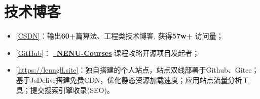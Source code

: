 \documentclass{resume}
\begin{document}
\section{技术博客}
\begin{itemize}[parsep=0.3ex] \normalsize
    \item \href{https://blog.csdn.net/liangllhahaha?type=blog}{[CSDN]}：输出\textbf{60+}篇算法、工程类技术博客, 
    获得\textbf{57w+} 访问量；

    \item \href{https://github.com/leungll}{[GitHub]}：
    \href{https://github.com/leungll/NENU-Courses}{\faGithub \ \textbf{NENU-Courses}} 课程攻略开源项目发起者；

    \item \href{https://leungll.site/archives}{[https://leungll.site]}：独自搭建的个人站点，站点双线部署于Github、Gitee；
    基于JsDelivr搭建免费CDN，优化静态资源加载速度；应用站点流量分析工具；提交搜索引擎收录(SEO)。
\end{itemize}
\end{document}
